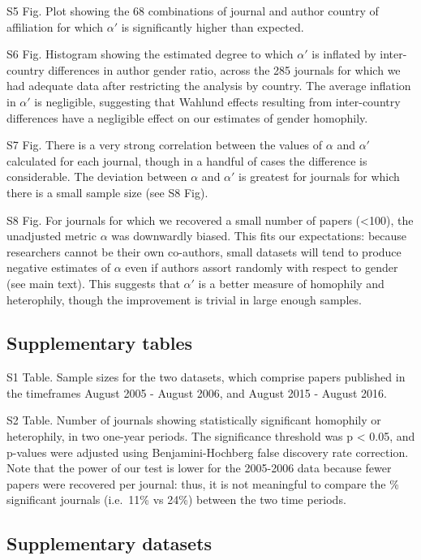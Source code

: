 \documentclass[12pt,]{article}
\begin{document}
S5 Fig. Plot showing the 68 combinations of journal and author country
of affiliation for which \(\alpha'\) is significantly higher than
expected.

S6 Fig. Histogram showing the estimated degree to which \(\alpha'\) is
inflated by inter-country differences in author gender ratio, across the
285 journals for which we had adequate data after restricting the
analysis by country. The average inflation in \(\alpha'\) is negligible,
suggesting that Wahlund effects resulting from inter-country differences
have a negligible effect on our estimates of gender homophily.

S7 Fig. There is a very strong correlation between the values of
\(\alpha\) and \(\alpha'\) calculated for each journal, though in a
handful of cases the difference is considerable. The deviation between
\(\alpha\) and \(\alpha'\) is greatest for journals for which there is a
small sample size (see S8 Fig).

S8 Fig. For journals for which we recovered a small number of papers
(\textless{}100), the unadjusted metric \(\alpha\) was downwardly
biased. This fits our expectations: because researchers cannot be their
own co-authors, small datasets will tend to produce negative estimates
of \(\alpha\) even if authors assort randomly with respect to gender
(see main text). This suggests that \(\alpha'\) is a better measure of
homophily and heterophily, though the improvement is trivial in large
enough samples.

\hypertarget{supplementary-tables}{%
\subsection{Supplementary tables}\label{supplementary-tables}}

S1 Table. Sample sizes for the two datasets, which comprise papers
published in the timeframes August 2005 - August 2006, and August 2015 -
August 2016.

S2 Table. Number of journals showing statistically significant homophily
or heterophily, in two one-year periods. The significance threshold was
p \textless{} 0.05, and p-values were adjusted using Benjamini-Hochberg
false discovery rate correction. Note that the power of our test is
lower for the 2005-2006 data because fewer papers were recovered per
journal: thus, it is not meaningful to compare the \% significant
journals (i.e.~11\% vs 24\%) between the two time periods.

\hypertarget{supplementary-datasets}{%
\subsection{Supplementary datasets}\label{supplementary-datasets}}
\end{document}
